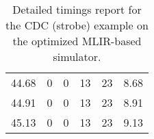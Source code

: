 \begin{table}[h]
{\begin{tabular}{cccccc}
            44.68              & 0                          & 0                          & 13                         & 23                         & 8.68                   \\
            44.91              & 0                          & 0                          & 13                         & 23                         & 8.91                   \\
            45.13              & 0                          & 0                          & 13                         & 23                         & 9.13                   \\
            \bottomrule
        \end{tabular}
    }
    \caption{Detailed timings report for the CDC (strobe) example on the optimized MLIR-based simulator.}
\end{table}


